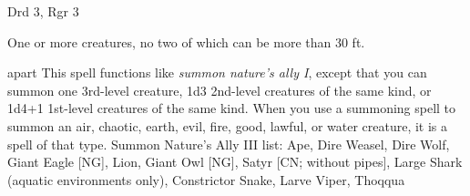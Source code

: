 
\begin{description*}
\item[Level:] Drd 3, Rgr 3
\item[Effect:] One or more creatures, no two of which can be more than 30 ft.
\end{description*}

apart
This spell functions like \textit{summon nature's ally I}, except that you can
summon one 3rd-level creature, 1d3 2nd-level creatures of the same kind, or 1d4+1
1st-level creatures of the same kind.
When you use a summoning spell to summon an air, chaotic, earth, evil, fire, good,
lawful, or water creature, it is a spell of that type.
Summon Nature's Ally III list: Ape, Dire Weasel, Dire Wolf, Giant Eagle [NG], Lion, Giant Owl [NG], Satyr [CN; without pipes], Large Shark (aquatic environments only), Constrictor Snake, Larve Viper, Thoqqua